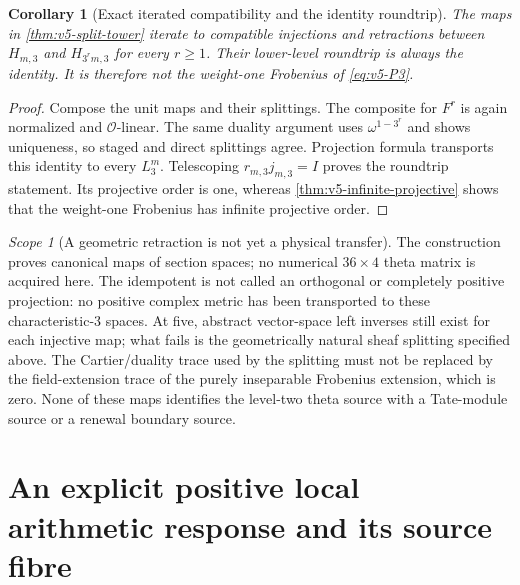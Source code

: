 \documentclass[11pt]{article}
\newtheorem{corollary}[corollary]{Corollary}
\theoremstyle{definition}
\theoremstyle{remark}
\newtheorem{scope}[scope]{Scope}
\begin{document}
\begin{corollary}[Exact iterated compatibility and the identity roundtrip]
\label{cor:v5-iterate-split}
The maps in \cref{thm:v5-split-tower} iterate to compatible injections and
retractions between $H_{m,3}$ and $H_{3^rm,3}$ for every $r\ge1$.
Their lower-level roundtrip is always the identity. It is therefore not
the weight-one Frobenius of \eqref{eq:v5-P3}.
\end{corollary}
\begin{proof}
Compose the unit maps and their splittings. The composite for $F^r$ is
again normalized and $\mathcal O$-linear. The same duality argument uses
$\omega^{1-3^r}$ and shows uniqueness, so staged and direct splittings
agree. Projection formula transports this identity to every $L_3^m$.
Telescoping $r_{m,3}j_{m,3}=I$ proves the roundtrip statement. Its
projective order is one, whereas \cref{thm:v5-infinite-projective}
shows that the weight-one Frobenius has infinite projective order.
\end{proof}

\begin{scope}[A geometric retraction is not yet a physical transfer]
The construction proves canonical maps of section spaces; no numerical
$36\times4$ theta matrix is acquired here. The idempotent is not called
an orthogonal or completely positive projection: no positive complex
metric has been transported to these characteristic-$3$ spaces. At five,
abstract vector-space left inverses still exist for each injective map;
what fails is the geometrically natural sheaf splitting specified above.
The Cartier/duality trace used by the splitting must not be replaced by
the field-extension trace of the purely inseparable Frobenius extension,
which is zero. None of these maps identifies the level-two theta source
with a Tate-module source or a renewal boundary source.
\end{scope}

\section{An explicit positive local arithmetic response and its source fibre}
\label{sec:v5-response}
\end{document}
